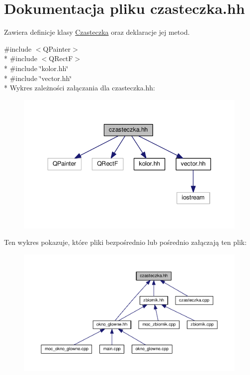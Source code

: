 \hypertarget{czasteczka_8hh}{\section{Dokumentacja pliku czasteczka.\-hh}
\label{czasteczka_8hh}
}


Zawiera definicje klasy \hyperlink{class_czasteczka}{Czasteczka} oraz deklaracje jej metod.  


{\ttfamily \#include $<$Q\-Painter$>$}\\*
{\ttfamily \#include $<$Q\-Rect\-F$>$}\\*
{\ttfamily \#include \char`\"{}kolor.\-hh\char`\"{}}\\*
{\ttfamily \#include \char`\"{}vector.\-hh\char`\"{}}\\*
Wykres zależności załączania dla czasteczka.\-hh\-:\nopagebreak
\begin{figure}[H]
\begin{center}
\leavevmode
\includegraphics[width=347pt]{czasteczka_8hh__incl}
\end{center}
\end{figure}
Ten wykres pokazuje, które pliki bezpośrednio lub pośrednio załączają ten plik\-:\nopagebreak
\begin{figure}[H]
\begin{center}
\leavevmode
\includegraphics[width=350pt]{czasteczka_8hh__dep__incl}
\end{center}
\end{figure}
